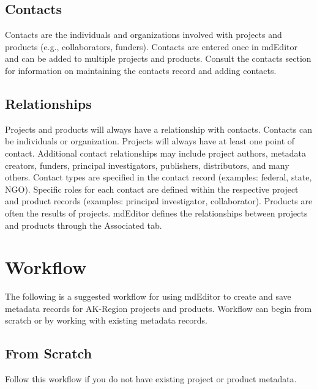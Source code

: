 \documentclass[
]{book}
\begin{document}
\hypertarget{contacts}{%
\section*{Contacts}\label{contacts}}

Contacts are the individuals and organizations involved with projects and products (e.g., collaborators, funders). Contacts are entered once in mdEditor and can be added to multiple projects and products.
Consult the contacts section for information on maintaining the contacts record and adding contacts.

\hypertarget{relationships}{%
\section*{Relationships}\label{relationships}}

Projects and products will always have a relationship with contacts. Contacts can be individuals or organization. Projects will always have at least one point of contact. Additional contact relationships may include project authors, metadata creators, funders, principal investigators, publishers, distributors, and many others.
Contact types are specified in the contact record (examples: federal, state, NGO). Specific roles for each contact are defined within the respective project and product records (examples: principal investigator, collaborator).
Products are often the results of projects. mdEditor defines the relationships between projects and products through the Associated tab.

\hypertarget{workflow}{%
\chapter*{Workflow}\label{workflow}}

The following is a suggested workflow for using mdEditor to create and save metadata records for AK-Region projects and products. Workflow can begin from scratch or by working with existing metadata records.

\hypertarget{from-scratch}{%
\section*{From Scratch}\label{from-scratch}}

Follow this workflow if you do not have existing project or product metadata.
\end{document}

